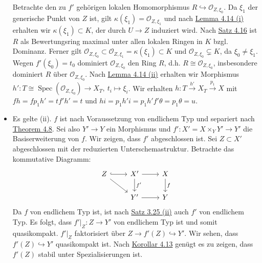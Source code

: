 \begin{itemize}
Betrachte den zu $f'$ gehörigen lokalen Homomorphismus $R\hookrightarrow\mathcal{O}_{Z,\xi_0}$. Da $\xi_1$ der generische Punkt von $Z$ ist, gilt $\kappa(\xi_1)=\mathcal{O}_{Z,\xi_1}$ und nach \hyperref[4.14]{Lemma 4.14 (i)} erhalten wir $\kappa(\xi_1)\subset K$, der durch $U\to Z$ induziert wird. Nach \hyperref[4.16]{Satz 4.16} ist $R$ als Bewertungsring maximal unter allen lokalen Ringen in $K$ bzgl. Dominanz. Ferner gilt $\mathcal{O}_{Z,\xi_0}\subset\mathcal{O}_{Z,\xi_1}=\kappa(\xi_1)\subset K$ und $\mathcal{O}_{Z,\xi_0}\subsetneq K$, da $\xi_0\neq\xi_1$. Wegen $f'(\xi_0)=t_0$ dominiert $\mathcal{O}_{Z,\xi_0}$ den Ring $R$, d.h. $R\cong\mathcal{O}_{Z,\xi_0}$, insbesondere dominiert $R$ über $\mathcal{O}_{Z,\xi_0}$. Nach \hyperref[4.14]{Lemma 4.14 (ii)} erhalten wir Morphismus $h':T\cong\operatorname{Spec}(\mathcal{O}_{Z,\xi_0})\to X_T,\ t_i\mapsto \xi_i$. Wir erhalten $h:T\stackrel{h'}{\to}X_T\stackrel{p_1}{\to}X$ mit $fh=fp_1h'=tf'h'=t$ und $hi=p_1h'i=p_1h'f'\theta = p_1\theta = u$.
\item Es gelte (ii). $f$ ist nach Voraussetzung von endlichem Typ und separiert nach \hyperref[4.8]{Theorem 4.8}. Sei also $Y'\to Y$ ein Morphismus und $f':X'=X\times_YY'\to Y'$ die Basiserweiterung von $f$. Wir zeigen, dass $f'$ abgeschlossen ist. Sei $Z\subset X'$ abgeschlossen mit der reduzierten Unterschemastruktur. Betrachte das kommutative Diagramm:
\[ \begin{tikzcd}
Z\ar[r, hook]\ar[dr] & X'\ar[r]\ar[d, "f'"] & X\ar[d, "f"]\\
& Y'\ar[r] & Y
\end{tikzcd} \]
Da $f$ von endlichem Typ ist, ist nach \hyperref[3.25]{Satz 3.25 (ii)} auch $f'$ von endlichem Typ. Es folgt, dass $f'|_Z:Z\to Y'$ von endlichem Typ ist und somit quasikompakt. $f'|_Z$ faktorisiert über $Z\to f'(Z)\hookrightarrow Y'$. Wir sehen, dass $f'(Z)\hookrightarrow Y'$ quasikompakt ist. Nach \hyperref[4.13]{Korollar 4.13} genügt es zu zeigen, dass $f'(Z)$ stabil unter Spezialisierungen ist.


\end{itemize}
